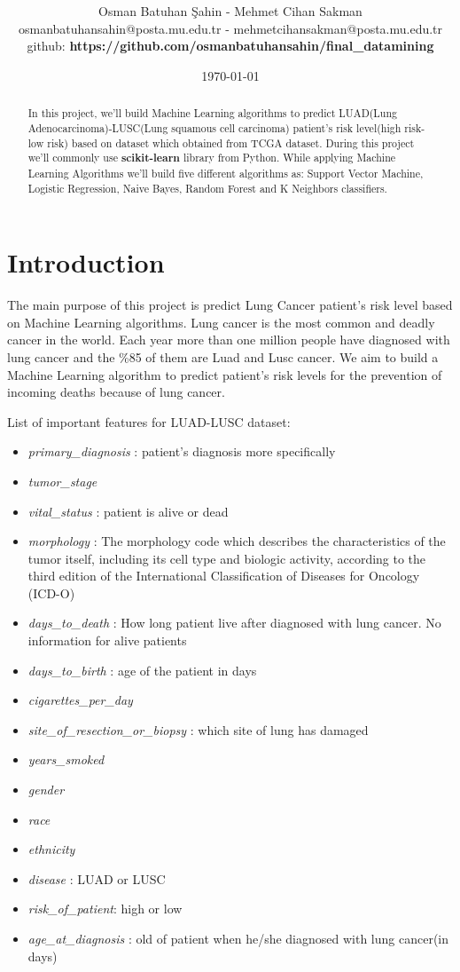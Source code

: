 \documentclass[onecolumn]{article}
\title{\spacecaps{Ceng 3521 Data Mining Final Project: Luad Lusc Cancer}\ 
\normalsize \spacesc }
\author{Osman Batuhan Şahin - Mehmet Cihan Sakman \\ osmanbatuhansahin@posta.mu.edu.tr - mehmetcihansakman@posta.mu.edu.tr\\github: \textbf{https://github.com/osmanbatuhansahin/final\_datamining}}
\date{\today}
\begin{document}
\maketitle

\begin{abstract}
In this project, we'll build Machine Learning algorithms to predict LUAD(Lung Adenocarcinoma)-LUSC(Lung squamous cell carcinoma) patient's risk level(high risk-low risk) based on dataset which obtained from TCGA dataset. During this project we'll commonly use \textbf{scikit-learn} library from Python. While applying Machine Learning Algorithms we'll build five different algorithms as: Support Vector Machine, Logistic Regression, Naive Bayes, Random Forest and K Neighbors classifiers.
\end{abstract}

\section{Introduction}
The main purpose of this project is predict Lung Cancer patient's risk level based on Machine Learning algorithms. Lung cancer is the most common and deadly cancer in the world. Each year more than one million people have diagnosed with lung cancer and the \%85 of them are Luad and Lusc cancer. We aim to build a Machine Learning algorithm to predict patient's risk levels for the prevention of incoming deaths because of lung cancer. 

List of important features for LUAD-LUSC dataset:
\begin{itemize}
    \item \emph{primary\_diagnosis} : patient's diagnosis more specifically
    \item  \emph{tumor\_stage} 
    \item  \emph{vital\_status} : patient is alive or dead
    \item  \emph{morphology} : The morphology code which describes the characteristics of the tumor itself, including its cell type and biologic activity, according to the third edition of the International Classification of Diseases for Oncology (ICD-O)
    \item  \emph{days\_to\_death} : How long patient live after diagnosed with lung cancer. No information for alive patients
    \item  \emph{days\_to\_birth} : age of the patient in days
    \item  \emph{cigarettes\_per\_day}
    \item  \emph{site\_of\_resection\_or\_biopsy} : which site of lung has damaged
    \item  \emph{years\_smoked}
    \item  \emph{gender}
    \item  \emph{race} 
    \item  \emph{ethnicity}
    \item  \emph{disease} : LUAD or LUSC
    \item  \emph{risk\_of\_patient}: high or low
     \item \emph{age\_at\_diagnosis} : old of patient when he/she diagnosed with lung cancer(in days)
\end{itemize}
\bigbreak
\end{document}
